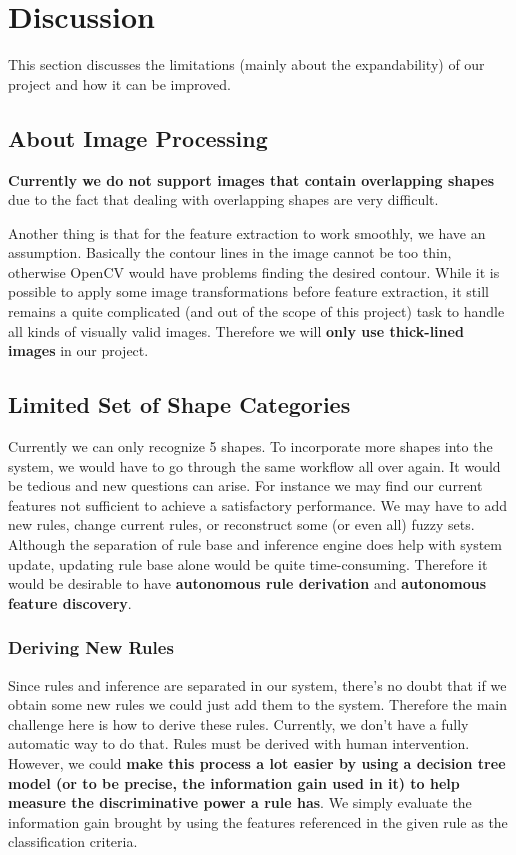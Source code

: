 \section{Discussion}

This section discusses the limitations (mainly about the expandability) of our project and how it can be improved.

\subsection{About Image Processing}

\textbf{Currently we do not support images that contain overlapping shapes} due to the fact that dealing with overlapping shapes are very difficult.

Another thing is that for the feature extraction to work smoothly, we have an assumption. Basically the contour lines in the image cannot be too thin, otherwise OpenCV would have problems finding the desired contour. While it is possible to apply some image transformations before feature extraction, it still remains a quite complicated (and out of the scope of this project) task to handle all kinds of visually valid images. Therefore we will \textbf{only use thick-lined images} in our project.

\subsection{Limited Set of Shape Categories}

Currently we can only recognize 5 shapes. To incorporate more shapes into the system, we would have to go through the same workflow all over again. It would be tedious and new questions can arise. For instance we may find our current features not sufficient to achieve a satisfactory performance. We may have to add new rules, change current rules, or reconstruct some (or even all) fuzzy sets. Although the separation of rule base and inference engine does help with system update, updating rule base alone would be quite time-consuming. Therefore it would be desirable to have \textbf{autonomous rule derivation} and \textbf{autonomous feature discovery}.

\subsubsection{Deriving New Rules}

Since rules and inference are separated in our system, there's no doubt that if we obtain some new rules we could just add them to the system. Therefore the main challenge here is how to derive these rules. Currently, we don't have a fully automatic way to do that. Rules must be derived with human intervention. However, we could \textbf{make this process a lot easier by using a decision tree model (or to be precise, the \textbf{information gain} used in it) to help measure the discriminative power a rule has}. We simply evaluate the information gain brought by using the features referenced in the given rule as the classification criteria.

